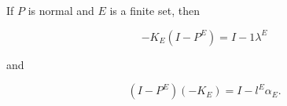 If $P$ is normal and $E$ is a finite set, then

$$-K_E(I - P^E) = I - 1\lambda^E$$

and

$$(I - P^E)(-K_E) = I - l^E\alpha_E.$$
